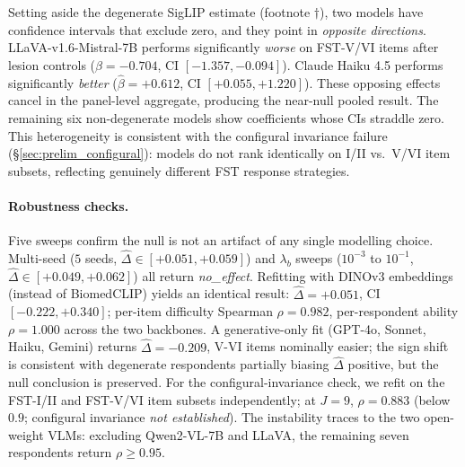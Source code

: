 \documentclass{article}
\begin{document}
Setting aside the degenerate SigLIP estimate (footnote $\dagger$), two models have confidence intervals that exclude zero, and they point in \emph{opposite directions}. LLaVA-v1.6-Mistral-7B performs significantly \emph{worse} on FST-V/VI items after lesion controls ($\hat\beta = -0.704$, CI $[-1.357, -0.094]$). Claude Haiku 4.5 performs significantly \emph{better} ($\hat\beta = +0.612$, CI $[+0.055, +1.220]$). These opposing effects cancel in the panel-level aggregate, producing the near-null pooled result. The remaining six non-degenerate models show coefficients whose CIs straddle zero. This heterogeneity is consistent with the configural invariance failure (\S\ref{sec:prelim_configural}): models do not rank identically on I/II vs.\ V/VI item subsets, reflecting genuinely different FST response strategies. 


\paragraph{Robustness checks.}
\label{sec:prelim_robustness}
\label{sec:prelim_seed_lambda}
\label{sec:prelim_cross_backbone}
\label{sec:prelim_configural}
Five sweeps confirm the null is not an artifact of any single modelling choice. Multi-seed ($5$ seeds, $\hat\Delta \in [+0.051, +0.059]$) and $\lambda_b$ sweeps ($10^{-3}$ to $10^{-1}$, $\hat\Delta \in [+0.049, +0.062]$) all return \emph{no\_effect}. Refitting with DINOv3 embeddings (instead of BiomedCLIP) yields an identical result: $\hat\Delta = +0.051$, CI $[-0.222, +0.340]$; per-item difficulty Spearman $\rho = 0.982$, per-respondent ability $\rho = 1.000$ across the two backbones. A generative-only fit (GPT-4o, Sonnet, Haiku, Gemini) returns $\hat\Delta = -0.209$, V-VI items nominally easier; the sign shift is consistent with degenerate respondents partially biasing $\hat\Delta$ positive, but the null conclusion is preserved. For the configural-invariance check, we refit on the FST-I/II and FST-V/VI item subsets independently; at $J = 9$, $\rho = 0.883$ (below $0.9$; configural invariance \emph{not established}). The instability traces to the two open-weight VLMs: excluding Qwen2-VL-7B and LLaVA, the remaining seven respondents return $\rho \geq 0.95$.




\end{document}
